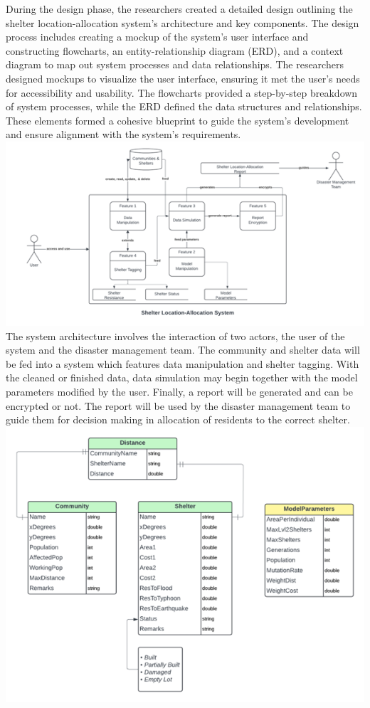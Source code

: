 During the design phase, the researchers created a detailed design outlining the shelter location-allocation system's architecture and key components. The design process includes creating a mockup of the system's user interface and constructing flowcharts, an entity-relationship diagram (ERD), and a context diagram to map out system processes and data relationships. The researchers designed mockups to visualize the user interface, ensuring it met the user's needs for accessibility and usability. The flowcharts provided a step-by-step breakdown of system processes, while the ERD defined the data structures and relationships. These elements formed a cohesive blueprint to guide the system's development and ensure alignment with the system's requirements. 
\includegraphics{DESIGN}
The system architecture involves the interaction of two actors, the user of the system and the disaster management team. The community and shelter data will be fed into a system which features data manipulation and shelter tagging. With the cleaned or finished data, data simulation may begin together with the model parameters modified by the user. Finally, a report will be generated and can be encrypted or not. The report will be used by the disaster management team to guide them for decision making in allocation of residents to the correct shelter.
\includegraphics{ERD}
